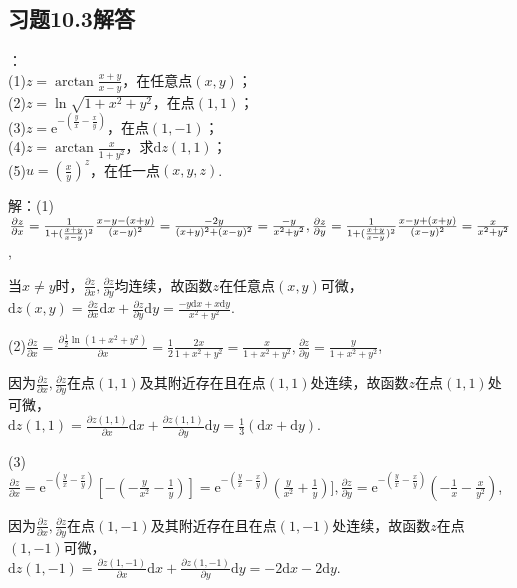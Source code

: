 \documentclass[12pt,UTF8]{ctexart}
\begin{document}
\subsection{习题10.3解答}
\begin{enumerate}
：
\\
(1)$z=\arctan\frac{x+y}{x-y}$，在任意点$(x,y)$；
\\
(2)$z=\ln\sqrt{1+x^2+y^2}$，在点$(1,1)$；
\\
(3)$z=\mathrm e^{-(\frac yx-\frac xy)}$，在点$(1,-1)$；
\\
(4)$z=\arctan\frac x{1+y^2}$，求$\mathrm dz(1,1)$；
\\
(5)$u=(\frac xy)^z$，在任一点$(x,y,z)$.

解：(1)$\frac{\partial z}{\partial x}=\frac1{1+(\frac{x+y}{x-y})^2}\frac{x-y-(x+y)}{(x-y)^2}=\frac{-2y}{(x+y)^2+(x-y)^2}=\frac{-y}{x^2+y^2},\\
\frac{\partial z}{\partial y}=\frac1{1+(\frac{x+y}{x-y})^2}\frac{x-y+(x+y)}{(x-y)^2}=\frac x{x^2+y^2}$,

当$x\neq y$时，$\frac{\partial z}{\partial x},\frac{\partial z}{\partial y}$均连续，故函数$z$在任意点$(x,y)$可微，\\
$\mathrm dz(x,y)=\frac{\partial z}{\partial x}\mathrm dx+\frac{\partial z}{\partial y}\mathrm dy=\frac{-y\mathrm dx+x\mathrm dy}{x^2+y^2}$.

(2)$\frac{\partial z}{\partial x}=\frac{\partial\frac12\ln(1+x^2+y^2)}{\partial x}=\frac12\frac{2x}{1+x^2+y^2}=\frac x{1+x^2+y^2},\frac{\partial z}{\partial y}=\frac y{1+x^2+y^2}$,

因为$\frac{\partial z}{\partial x},\frac{\partial z}{\partial y}$在点$(1,1)$及其附近存在且在点$(1,1)$处连续，故函数$z$在点$(1,1)$处可微，\\
$\mathrm dz(1,1)=\frac{\partial z(1,1)}{\partial x}\mathrm dx+\frac{\partial z(1,1)}{\partial y}\mathrm dy=\frac13(\mathrm dx+\mathrm dy)$.

(3)$\frac{\partial z}{\partial x}=\mathrm e^{-(\frac yx-\frac xy)}[-(-\frac y{x^2}-\frac1y)]=\mathrm e^{-(\frac yx-\frac xy)}(\frac y{x^2}+\frac1y)],\frac{\partial z}{\partial y}=\mathrm e^{-(\frac yx-\frac xy)}(-\frac1x-\frac x{y^2})$,

因为$\frac{\partial z}{\partial x},\frac{\partial z}{\partial y}$在点$(1,-1)$及其附近存在且在点$(1,-1)$处连续，故函数$z$在点$(1,-1)$可微，\\
$\mathrm dz(1,-1)=\frac{\partial z(1,-1)}{\partial x}\mathrm dx+\frac{\partial z(1,-1)}{\partial y}\mathrm dy=-2\mathrm dx-2\mathrm dy$.


\end{enumerate}
\end{document}
